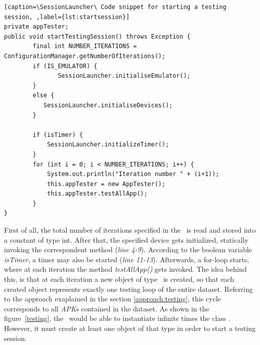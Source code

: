 \begin{lstlisting}[caption=\SessionLauncher\ Code snippet for starting a testing session, ,label={lst:startsession}]
private appTester; 
public void startTestingSession() throws Exception {
        final int NUMBER_ITERATIONS = ConfigurationManager.getNumberOfIterations();
        if (IS_EMULATOR) {
        	   SessionLauncher.initialiseEmulator();
        }
        else {
       	   SessionLauncher.initialiseDevices();
        }
       
        if (isTimer) {
            SessionLauncher.initializeTimer();
        }
        for (int i = 0; i < NUMBER_ITERATIONS; i++) {
            System.out.println("Iteration number " + (i+1));
            this.appTester = new AppTester();
            this.appTester.testAllApp();
        }
}
\end{lstlisting}
First of all, the total number of iterations specified in the \Config\ is read and stored into a constant of type int. After that, the specified device gets initialized, statically invoking the correspondent method (\textit{line 4-9}).  
According to the boolean variable \textit{isTimer}, a timer may also be started (\textit{line 11-13}).
Afterwards, a for-loop starts, where at each iteration the method \textit{testAllApp()} gets invoked. 
The idea behind this, is that at each iteration a new object of type \AppTester\ is created, so that each created object represents exactly one testing loop of the entire dataset. 
Referring to the approach exaplained in the section \ref{approach:testing}, this cycle corresponds to
all \textit{APKs} contained in the dataset. 
As shown in the figure~\ref{testing}, the \SessionLauncher\ would be able to instantiate infinite times the class \AppTester. However, it must create at least one object of that type in order to start a testing session. 

